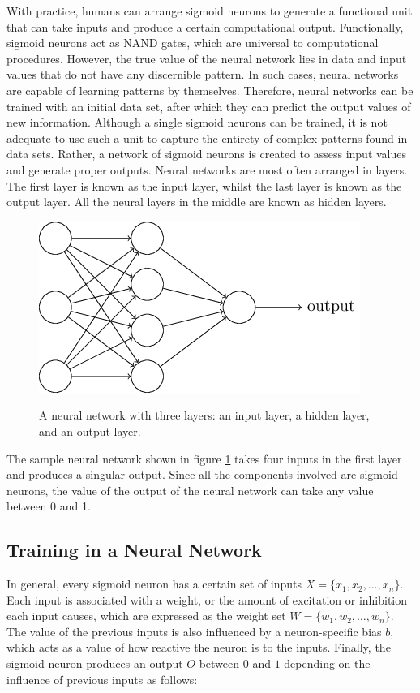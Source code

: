 With practice, humans can arrange sigmoid neurons to generate a functional unit that can take inputs and produce a certain computational output.
Functionally, sigmoid neurons act as NAND gates, which are universal to computational procedures.
However, the true value of the neural network lies in data and input values that do not have any discernible pattern.
In such cases, neural networks are capable of learning patterns by themselves.
Therefore, neural networks can be trained with an initial data set, after which they can predict the output values of new information.
Although a single sigmoid neurons can be trained, it is not adequate to use such a unit to capture the entirety of complex patterns found in data sets.
Rather, a network of sigmoid neurons is created to assess input values and generate proper outputs.
Neural networks are most often arranged in layers.
The first layer is known as the input layer, whilst the last layer is known as the output layer.
All the neural layers in the middle are known as hidden layers. 
\begin{figure}[h]
    \centering
        \caption{A neural network with three layers: an input layer, a hidden layer, and an output layer.}
    \includegraphics[scale=0.75]{pictures/NeuralNetworks/neuralNetwork.png}
    \label{fig:neuralNetwork}
\end{figure}
The sample neural network shown in figure \ref{fig:neuralNetwork} takes four inputs in the first layer and produces a singular output.
Since all the components involved are sigmoid neurons, the value of the output of the neural network can take any value between 0 and 1. 

\subsection{Training in a Neural Network}

In general, every sigmoid neuron has a certain set of inputs $X=\{x_1, x_2, \hdots , x_n\}$.
Each input is associated with a weight, or the amount of excitation or inhibition each input causes, which are expressed as the weight set $W=\{w_1, w_2, \hdots , w_n\}$.
The value of the previous inputs is also influenced by a neuron-specific bias $b$, which acts as a value of how reactive the neuron is to the inputs.
Finally, the sigmoid neuron produces an output $O$ between $0$ and $1$ depending on the influence of previous inputs as follows:

